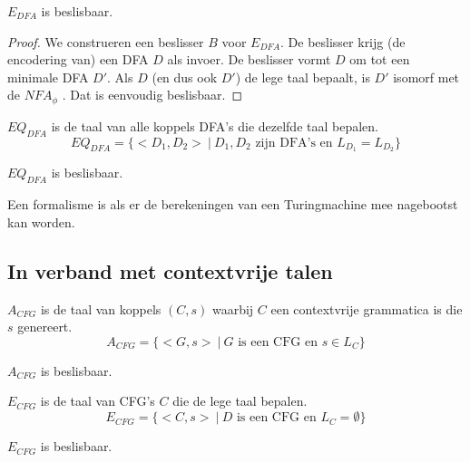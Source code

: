 \documentclass[main.tex]{subfiles}
\begin{document}
\begin{st}
  \label{st:e-dfa-besl}
  $E_{DFA}$ is beslisbaar.

  \begin{proof}
    We construeren een beslisser $B$ voor $E_{DFA}$.
    De beslisser krijg (de encodering van) een DFA $D$ als invoer.
    De beslisser vormt $D$ om tot een minimale DFA $D'$.
    Als $D$ (en dus ook $D'$) de lege taal bepaalt, is $D'$ isomorf met de $NFA_{\phi}$ .
    Dat is eenvoudig beslisbaar.
\waarom
  \end{proof}
\end{st}

\begin{de}
  \label{de:eq-dfa}
  $EQ_{DFA}$ is de taal van alle koppels DFA's die dezelfde taal bepalen.
  \[ EQ_{DFA} = \{ <D_{1},D_{2}> \ |\ D_{1},D_{2} \text{ zijn DFA's en } L_{D_{1}} = L_{D_{2}} \} \]  
\end{de}

\begin{st}
  \label{st:eq-dfa-besl}
  $EQ_{DFA}$ is beslisbaar.
\end{st}

\begin{de}
  Een formalisme is  als er de berekeningen van een Turingmachine mee nagebootst kan worden.
\end{de}
\subsection{In verband met contextvrije talen}
\label{sec:verb-met-cont}

\begin{de}
  \label{de:a-cfg}
  $A_{CFG}$ is de taal van koppels $(C,s)$ waarbij $C$ een contextvrije grammatica is die $s$ genereert.
  \[ A_{CFG} = \{ <G,s> \ |\ G \text{ is een CFG en } s \in L_{C} \} \]
\end{de}

\begin{st}
  $A_{CFG}$ is beslisbaar.
\end{st}

\begin{de}
  $E_{CFG}$ is de taal van CFG's $C$ die de lege taal bepalen.
  \[ E_{CFG} = \{ <C,s>\ |\ D \text{ is een CFG en } L_{C} = \emptyset \} \]
\end{de}

\begin{st}
  $E_{CFG}$ is beslisbaar.
\end{st}
\end{document}
